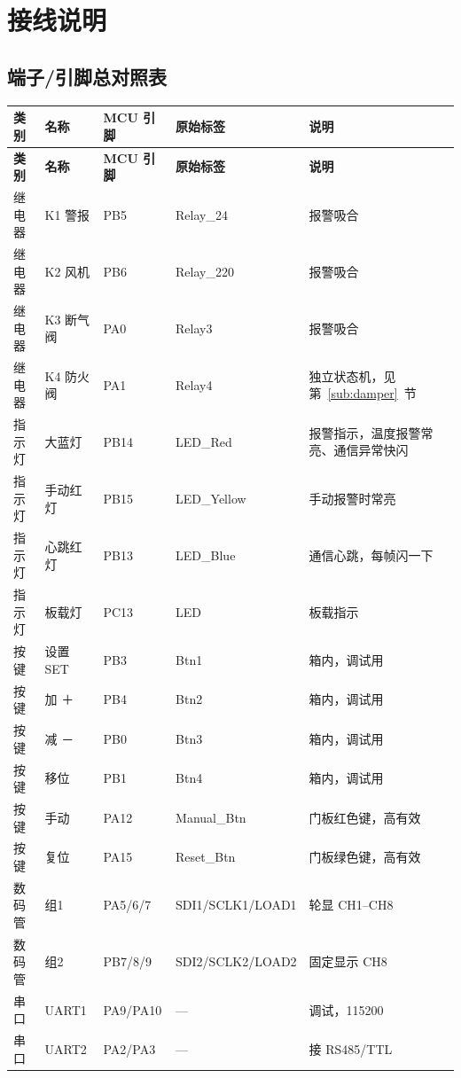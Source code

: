 \documentclass[a4paper,11pt]{ctexart}
\begin{document}
\section{接线说明}
\subsection{端子/引脚总对照表}
\renewcommand{\arraystretch}{1.25}
\begin{longtable}{|L{1.35cm}|L{2.4cm}|C{1.75cm}|L{3.3cm}|L{4.2cm}|}
\hline
\textbf{类别} & \textbf{名称} & \textbf{MCU 引脚} & \textbf{原始标签} & \textbf{说明}\\
\hline
\endfirsthead
\hline
\textbf{类别} & \textbf{名称} & \textbf{MCU 引脚} & \textbf{原始标签} & \textbf{说明}\\
\hline
\endhead
继电器 & K1 警报    & PB5 & Relay\_24  & 报警吸合\\ \hline
继电器 & K2 风机    & PB6 & Relay\_220 & 报警吸合\\ \hline
继电器 & K3 断气阀  & PA0 & Relay3     & 报警吸合\\ \hline
继电器 & K4 防火阀  & PA1 & Relay4     & 独立状态机，见第~\ref{sub:damper}~节\\ \hline
指示灯 & 大蓝灯   & PB14 & LED\_Red    & 报警指示，温度报警常亮、通信异常快闪\\ \hline
指示灯 & 手动红灯 & PB15 & LED\_Yellow & 手动报警时常亮\\ \hline
指示灯 & 心跳红灯 & PB13 & LED\_Blue   & 通信心跳，每帧闪一下\\ \hline
指示灯 & 板载灯     & PC13 & LED         & 板载指示\\ \hline
按键 & 设置 SET & PB3 & Btn1 & 箱内，调试用\\ \hline
按键 & 加 ＋    & PB4 & Btn2 & 箱内，调试用\\ \hline
按键 & 减 －    & PB0 & Btn3 & 箱内，调试用\\ \hline
按键 & 移位     & PB1 & Btn4 & 箱内，调试用\\ \hline
按键 & 手动     & PA12 & Manual\_Btn & 门板红色键，高有效\\ \hline
按键 & 复位     & PA15 & Reset\_Btn  & 门板绿色键，高有效\\ \hline
数码管 & 组1 & PA5/6/7 & SDI1\slash SCLK1\slash LOAD1 & 轮显 CH1--CH8\\ \hline
数码管 & 组2 & PB7/8/9 & SDI2\slash SCLK2\slash LOAD2 & 固定显示 CH8\\ \hline
串口 & UART1 & PA9/PA10 & --- & 调试，115200\\ \hline
串口 & UART2 & PA2/PA3 & --- & 接 RS485/TTL\\ \hline
\end{longtable}
\renewcommand{\arraystretch}{1.0}
\end{document}
